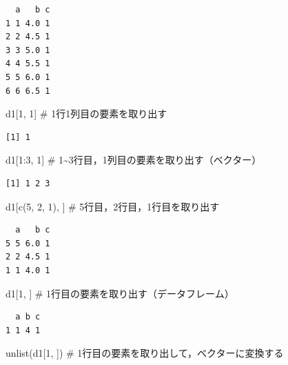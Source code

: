 \documentclass[
  letterpaper,
  DIV=11,
  numbers=noendperiod]{scrreprt}
\newenvironment{Shaded}{\begin{snugshade}}{\end{snugshade}}
\newcommand{\CommentTok}[1]{\textcolor[rgb]{0.37,0.37,0.37}{#1}}
\newcommand{\DecValTok}[1]{\textcolor[rgb]{0.68,0.00,0.00}{#1}}
\newcommand{\FunctionTok}[1]{\textcolor[rgb]{0.28,0.35,0.67}{#1}}
\newcommand{\NormalTok}[1]{\textcolor[rgb]{0.00,0.23,0.31}{#1}}
\newcommand{\SpecialCharTok}[1]{\textcolor[rgb]{0.37,0.37,0.37}{#1}}
\begin{document}
\begin{verbatim}
  a   b c
1 1 4.0 1
2 2 4.5 1
3 3 5.0 1
4 4 5.5 1
5 5 6.0 1
6 6 6.5 1
\end{verbatim}

\begin{Shaded}
\begin{Highlighting}[]
\NormalTok{d1[}\DecValTok{1}\NormalTok{, }\DecValTok{1}\NormalTok{] }\CommentTok{\# 1行1列目の要素を取り出す}
\end{Highlighting}
\end{Shaded}

\begin{verbatim}
[1] 1
\end{verbatim}

\begin{Shaded}
\begin{Highlighting}[]
\NormalTok{d1[}\DecValTok{1}\SpecialCharTok{:}\DecValTok{3}\NormalTok{, }\DecValTok{1}\NormalTok{] }\CommentTok{\# 1\textasciitilde{}3行目，1列目の要素を取り出す（ベクター）}
\end{Highlighting}
\end{Shaded}

\begin{verbatim}
[1] 1 2 3
\end{verbatim}

\begin{Shaded}
\begin{Highlighting}[]
\NormalTok{d1[}\FunctionTok{c}\NormalTok{(}\DecValTok{5}\NormalTok{, }\DecValTok{2}\NormalTok{, }\DecValTok{1}\NormalTok{), ] }\CommentTok{\# 5行目，2行目，1行目を取り出す}
\end{Highlighting}
\end{Shaded}

\begin{verbatim}
  a   b c
5 5 6.0 1
2 2 4.5 1
1 1 4.0 1
\end{verbatim}

\begin{Shaded}
\begin{Highlighting}[]
\NormalTok{d1[}\DecValTok{1}\NormalTok{, ] }\CommentTok{\# 1行目の要素を取り出す（データフレーム）}
\end{Highlighting}
\end{Shaded}

\begin{verbatim}
  a b c
1 1 4 1
\end{verbatim}

\begin{Shaded}
\begin{Highlighting}[]
\FunctionTok{unlist}\NormalTok{(d1[}\DecValTok{1}\NormalTok{, ]) }\CommentTok{\# 1行目の要素を取り出して，ベクターに変換する}
\end{Highlighting}
\end{Shaded}
\end{document}
